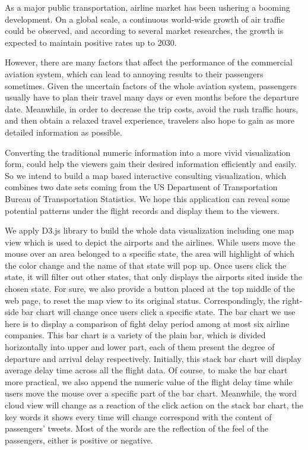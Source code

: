 As a major public transportation, airline market has been ushering a booming development. On a global scale, a continuous world-wide growth of air traffic could be observed, and according to several market researches, the growth is expected to maintain positive rates up to 2030.

However, there are many factors that affect the performance of the commercial aviation system, which can lead to annoying results to their passengers sometimes. Given the uncertain factors of the whole aviation system, passengers usually have to plan their travel many days or even months before the departure date. Meanwhile, in order to decrease the trip costs, avoid the rush traffic hours, and then obtain a relaxed travel experience, travelers also hope to gain as more detailed information as possible.

Converting the traditional numeric information into a more vivid visualization form, could help the viewers gain their desired information efficiently and easily. So we intend to build a map based interactive consulting visualization, which combines two date sets coming from the US Department of Transportation Bureau of Transportation Statistics. We hope this application can reveal some potential patterns under the flight records and display them to the viewers.

We apply D3.js library to build the whole data visualization including one map view which is used to depict the airports and the airlines. While users move the mouse over an area belonged to a specific state, the area will highlight of which the color change and the name of that state will pop up. Once users click the state, it will filter out other states, that only displays the airports sited inside the chosen state. For sure, we also provide a button placed at the top middle of the web page, to reset the map view to its original status. Correspondingly, the right-side bar chart will change once users click a specific state. The bar chart we use here is to display a comparison of fight delay period among at most six airline companies. This bar chart is a variety of the plain bar, which is divided horizontally into upper and lower part, each of them present the degree of departure and arrival delay respectively. Initially, this stack bar chart will display average delay time across all the flight data. Of course, to make the bar chart more practical, we also append the numeric value of the flight delay time while users move the mouse over a specific part of the bar chart. Meanwhile, the word cloud view will change as a reaction of the click action on the stack bar chart, the key words it shows every time will change correspond with the content of passengers’ tweets. Most of the words are the reflection of the feel of the passengers, either is positive or negative.



